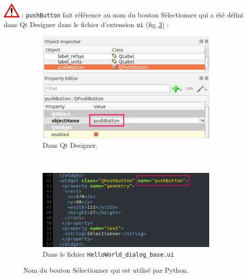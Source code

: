 \documentclass[11pt]{article}
\begin{document}
\begin{enumerate}
\includegraphics[scale=1]{warningt.png} \underline{}: \og{}\texttt{pushButton}\fg{} fait référence au nom du bouton \og{}Sélectionner\fg{} qui a été défini dans \og{}Qt Designer\fg{} dans le fichier d'extension \og{}\texttt{ui}\fg{} (fig.\,\ref{pushbutton}) : 
\vspace*{-0.4em}
\begin{figure}[H]
    \centering
    \begin{subfigure}[t]{0.44\textwidth}
    \centering
    	\includegraphics[width=1\textwidth]{qtpushbutton.png}
    	\caption{Dans Qt Designer.}
    	\label{pushbutton:qt}
    \end{subfigure}
    ~
    \begin{subfigure}[t]{0.44\textwidth}
    \centering
    		\includegraphics[width=1\textwidth]{push_button.png}
    	\caption{Dans le fichier \texttt{HelloWorld\_dialog\_base.ui}}
    	\label{pushbutton:ui}
    \end{subfigure}
    \vspace*{-0.64em}
    \caption[Nom du bouton \og{}Sélectionner\fg{}]{Nom du bouton \og{}Sélectionner\fg{} qui est utilisé par Python.}
    \label{pushbutton}
\end{figure}


\end{enumerate}
\end{document}
